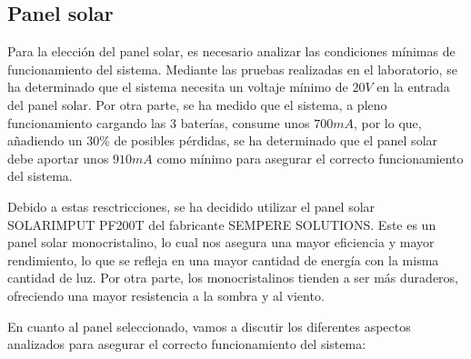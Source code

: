 \subsection{Panel solar}
Para la elección del panel solar, es necesario analizar las condiciones mínimas de funcionamiento del sistema. Mediante las pruebas realizadas en el laboratorio, se ha determinado que el sistema necesita un voltaje mínimo de $20 V$ en la entrada del panel solar. Por otra parte, se ha medido que el sistema, a pleno funcionamiento cargando las 3 baterías, consume unos $700 mA$, por lo que, añadiendo un 30\% de posibles pérdidas, se ha determinado que el panel solar debe aportar unos $910 mA$ como mínimo para asegurar el correcto funcionamiento del sistema.

Debido a estas resctricciones, se ha decidido utilizar el panel solar SOLARIMPUT PF200T del fabricante SEMPERE SOLUTIONS. Este es un panel solar monocristalino, lo cual nos asegura una mayor eficiencia y mayor rendimiento, lo que se refleja en una mayor cantidad de energía con la misma cantidad de luz. Por otra parte, los monocristalinos tienden a ser más duraderos, ofreciendo una mayor resistencia a la sombra y al viento.\cite{autosolarDiferenciasEntreSilicio} 

En cuanto al panel seleccionado, vamos a discutir los diferentes aspectos analizados para asegurar el correcto funcionamiento del sistema:

